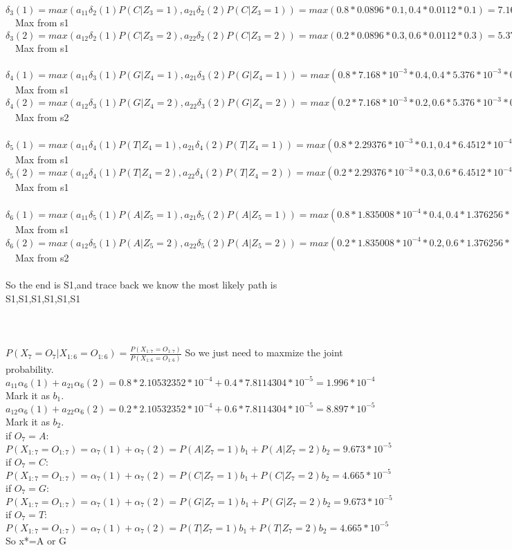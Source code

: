 \documentclass[11pt]{article}
\begin{document}
$\delta_3(1)=max(a_{11}\delta_2(1)P(C|Z_3=1),a_{21}\delta_2(2)P(C|Z_3=1))=max(0.8*0.0896*0.1,0.4*0.0112*0.1)=7.168*10^{-3}$\ \ Max from s1\\
$\delta_3(2)=max(a_{12}\delta_2(1)P(C|Z_3=2),a_{22}\delta_2(2)P(C|Z_3=2))=max(0.2*0.0896*0.3,0.6*0.0112*0.3)=5.376*10^{-3}$\ \ Max from s1\\\\
$\delta_4(1)=max(a_{11}\delta_3(1)P(G|Z_4=1),a_{21}\delta_3(2)P(G|Z_4=1))=max(0.8*7.168*10^{-3}*0.4,0.4*5.376*10^{-3}*0.4)=2.29376*10^{-3}$\ \ Max from s1\\
$\delta_4(2)=max(a_{12}\delta_3(1)P(G|Z_4=2),a_{22}\delta_3(2)P(G|Z_4=2))=max(0.2*7.168*10^{-3}*0.2,0.6*5.376*10^{-3}*0.2)=6.4512*10^{-4}$\ \ Max from s2\\\\
$\delta_5(1)=max(a_{11}\delta_4(1)P(T|Z_4=1),a_{21}\delta_4(2)P(T|Z_4=1))=max(0.8*2.29376*10^{-3}*0.1,0.4*6.4512*10^{-4}*0.1)=1.835008*10^{-4}$\ \ Max from s1\\
$\delta_5(2)=max(a_{12}\delta_4(1)P(T|Z_4=2),a_{22}\delta_4(2)P(T|Z_4=2))=max(0.2*2.29376*10^{-3}*0.3,0.6*6.4512*10^{-4}*0.3)=1.376256*10^{-4}$\ \ Max from s1\\\\
$\delta_6(1)=max(a_{11}\delta_5(1)P(A|Z_5=1),a_{21}\delta_5(2)P(A|Z_5=1))=max(0.8*1.835008*10^{-4}*0.4,0.4*1.376256*10^{-4}*0.4)=5.872*10^{-5}$\ \ Max from s1\\
$\delta_6(2)=max(a_{12}\delta_5(1)P(A|Z_5=2),a_{22}\delta_5(2)P(A|Z_5=2))=max(0.2*1.835008*10^{-4}*0.2,0.6*1.376256*10^{-4}*0.2)=1.6515072*10^{-5}$\ \ Max from s2\\\\
So the end is S1,and trace back we know the most likely path is S1,S1,S1,S1,S1,S1\\\\\\

\\
$P(X_7=O_7|X_{1:6}=O_{1:6})=\frac{P(X_{1:7}=O_{1:7})}{P(X_{1:6}=O_{1:6})}$
So we just need to maxmize the joint probability.\\
$a_{11}\alpha_6(1)+a_{21}\alpha_6(2)=0.8*2.10532352*10^{-4}+0.4*7.8114304*10^{-5}=1.996*10^{-4}$ Mark it as $b_1$.\\
$a_{12}\alpha_6(1)+a_{22}\alpha_6(2)=0.2*2.10532352*10^{-4}+0.6*7.8114304*10^{-5}=8.897*10^{-5}$ Mark it as $b_2$.\\
if $O_7=A$:
$P(X_{1:7}=O_{1:7})=\alpha_7(1)+\alpha_7(2)=P(A|Z_7=1)b_1+P(A|Z_7=2)b_2=9.673*10^{-5}$\\
if $O_7=C$:
$P(X_{1:7}=O_{1:7})=\alpha_7(1)+\alpha_7(2)=P(C|Z_7=1)b_1+P(C|Z_7=2)b_2=4.665*10^{-5}$\\
if $O_7=G$:
$P(X_{1:7}=O_{1:7})=\alpha_7(1)+\alpha_7(2)=P(G|Z_7=1)b_1+P(G|Z_7=2)b_2=9.673*10^{-5}$\\
if $O_7=T$:
$P(X_{1:7}=O_{1:7})=\alpha_7(1)+\alpha_7(2)=P(T|Z_7=1)b_1+P(T|Z_7=2)b_2=4.665*10^{-5}$\\
So x*=A or G
\end{document}
